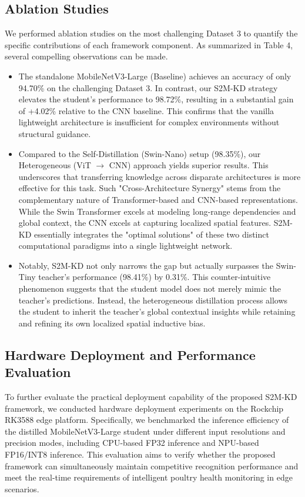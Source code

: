 \documentclass[review]{elsarticle}
\begin{document}
\subsection{Ablation Studies} \label{subsec:abastu}

We performed ablation studies on the most challenging Dataset 3 to quantify the specific contributions of each framework component.
As summarized in Table 4, several compelling observations can be made.
\begin{itemize}
\item The standalone MobileNetV3-Large (Baseline) achieves an accuracy of only 94.70\% on the challenging Dataset 3. In contrast, our S2M-KD strategy elevates the student’s performance to 98.72\%, resulting in a substantial gain of +4.02\% relative to the CNN baseline. This confirms that the vanilla lightweight architecture is insufficient for complex environments without structural guidance.
\item Compared to the Self-Distillation (Swin-Nano) setup (98.35\%), our Heterogeneous (ViT $\rightarrow$ CNN) approach yields superior results. This underscores that transferring knowledge across disparate architectures is more effective for this task. Such "Cross-Architecture Synergy" stems from the complementary nature of Transformer-based and CNN-based representations. While the Swin Transformer excels at modeling long-range dependencies and global context, the CNN excels at capturing localized spatial features. S2M-KD essentially integrates the "optimal solutions" of these two distinct computational paradigms into a single lightweight network.
\item Notably, S2M-KD not only narrows the gap but actually surpasses the Swin-Tiny teacher’s performance (98.41\%) by 0.31\%. This counter-intuitive phenomenon suggests that the student model does not merely mimic the teacher’s predictions. Instead, the heterogeneous distillation process allows the student to inherit the teacher's global contextual insights while retaining and refining its own localized spatial inductive bias.
\end{itemize}

\subsection{Hardware Deployment and Performance Evaluation}
\label{sec:deployment}
To further evaluate the practical deployment capability of the proposed S2M-KD framework, we conducted hardware deployment experiments on the Rockchip RK3588 edge platform. Specifically, we benchmarked the inference efficiency of the distilled MobileNetV3-Large student under different input resolutions and precision modes, including CPU-based FP32 inference and NPU-based FP16/INT8 inference. This evaluation aims to verify whether the proposed framework can simultaneously maintain competitive recognition performance and meet the real-time requirements of intelligent poultry health monitoring in edge scenarios.
\end{document}
